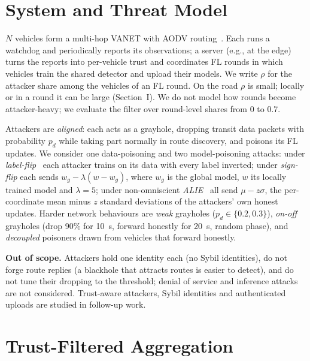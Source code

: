 \documentclass[conference]{IEEEtran}
\begin{document}
\section{System and Threat Model}
\label{sec:model}

$N$ vehicles form a multi-hop VANET with AODV routing~\cite{rfc3561}. Each runs a watchdog and periodically reports its
observations; a server (e.g., at the edge) turns the reports into per-vehicle trust and coordinates FL rounds in
which vehicles train the shared detector and upload their models. We write $\rho$ for the attacker share among the
vehicles of an FL round. On the road $\rho$ is small; locally or in a round it can be large (Section~I). We do not model how
rounds become attacker-heavy; we evaluate the filter over round-level shares from 0 to 0.7.

Attackers are \emph{aligned}: each acts as a grayhole, dropping transit data packets with probability $p_d$ while
taking part normally in route discovery, and poisons its FL updates. We consider one data-poisoning and two
model-poisoning attacks: under \emph{label-flip}~\cite{tolpegin2020} each attacker trains on its data with every label inverted; under
\emph{sign-flip} each sends $w_g - \lambda (w - w_g)$, where $w_g$ is the global model, $w$ its locally trained model
and $\lambda = 5$; under non-omniscient \emph{ALIE}~\cite{baruch2019} all send $\mu - z\sigma$, the per-coordinate mean
minus $z$ standard deviations of the attackers' own honest updates. Harder network behaviours
are \emph{weak} grayholes ($p_d \in \{0.2, 0.3\}$), \emph{on-off} grayholes (drop 90\% for 10~s, forward honestly for
20~s, random phase), and \emph{decoupled} poisoners drawn from vehicles that forward honestly.

\textbf{Out of scope.} Attackers hold one identity each (no Sybil identities), do not forge route replies (a blackhole
that attracts routes is easier to detect), and do not tune their dropping to the threshold; denial of service and
inference attacks are not considered. Trust-aware attackers, Sybil identities and authenticated uploads are studied
in follow-up work.

\section{Trust-Filtered Aggregation}
\label{sec:method}
\end{document}
